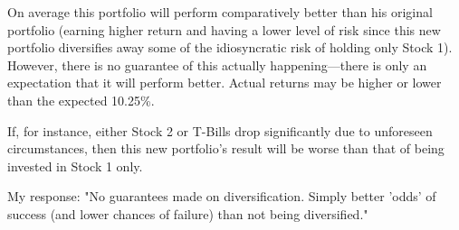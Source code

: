 \documentclass[12pt]{article}
\begin{document}
On average this portfolio will perform comparatively better than his original portfolio (earning higher return and having a lower level of risk since this new portfolio diversifies away some of the idiosyncratic risk of holding only Stock 1). However, there is no guarantee of this actually happening---there is only an expectation that it will perform better. Actual returns may be higher or lower than the expected 10.25\%.

If, for instance, either Stock 2 or T-Bills drop significantly due to unforeseen circumstances, then this new portfolio's result will be worse than that of being invested in Stock 1 only.

My response: "No guarantees made on diversification. Simply better 'odds' of success (and lower chances of failure) than not being diversified."

\section{}
\end{document}
